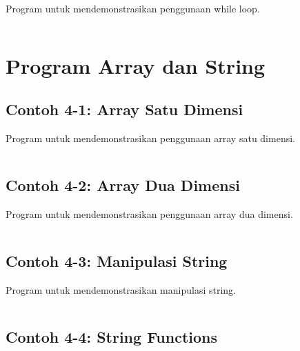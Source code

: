 Program untuk mendemonstrasikan penggunaan while loop.

\begin{lstlisting}[language=c++, caption=While Loop]

\end{lstlisting}

\section{Program Array dan String}

\subsection{Contoh 4-1: Array Satu Dimensi}

Program untuk mendemonstrasikan penggunaan array satu dimensi.

\begin{lstlisting}[language=c++, caption=Array Satu Dimensi]

\end{lstlisting}

\subsection{Contoh 4-2: Array Dua Dimensi}

Program untuk mendemonstrasikan penggunaan array dua dimensi.

\begin{lstlisting}[language=c++, caption=Array Dua Dimensi]

\end{lstlisting}

\subsection{Contoh 4-3: Manipulasi String}

Program untuk mendemonstrasikan manipulasi string.

\begin{lstlisting}[language=c++, caption=Manipulasi String]

\end{lstlisting}

\subsection{Contoh 4-4: String Functions}

